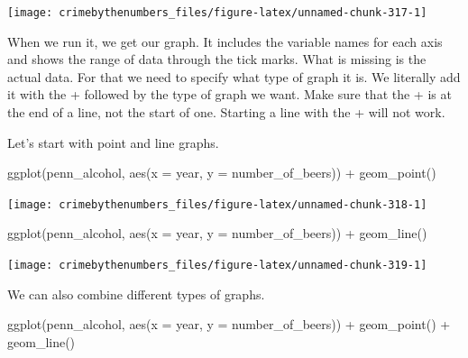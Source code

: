 \documentclass[
]{krantz}
\makeatletter
\newenvironment{Shaded}{\begin{snugshade}}{\end{snugshade}}
\newcommand{\AttributeTok}[1]{\textcolor[rgb]{0.61,0.61,0.61}{#1}}
\newcommand{\FunctionTok}[1]{\textcolor[rgb]{0,0,0}{#1}}
\newcommand{\NormalTok}[1]{#1}
\newcommand{\SpecialCharTok}[1]{\textcolor[rgb]{0,0,0}{#1}}
\newenvironment{kframe}{%
\medskip{}
\setlength{\fboxsep}{.8em}
 \def\at@end@of@kframe{}%
 \ifinner\ifhmode%
  \def\at@end@of@kframe{\end{minipage}}%
  \begin{minipage}{\columnwidth}%
 \fi\fi%
 \def\FrameCommand##1{\hskip\@totalleftmargin \hskip-\fboxsep
 \colorbox{shadecolor}{##1}\hskip-\fboxsep
     \hskip-\linewidth \hskip-\@totalleftmargin \hskip\columnwidth}%
 \MakeFramed {\advance\hsize-\width
   \@totalleftmargin\z@ \linewidth\hsize
   \@setminipage}}%
 {\par\unskip\endMakeFramed%
 \at@end@of@kframe}
\renewenvironment{Shaded}{\begin{kframe}}{\end{kframe}}
\makeatother
\begin{document}
\begin{center}\texttt{[image: crimebythenumbers\_files/figure-latex/unnamed-chunk-317-1]} \end{center}

When we run it, we get our graph. It includes the variable names for each axis and shows the range of data through the tick marks. What is missing is the actual data. For that we need to specify what type of graph it is. We literally add it with the + followed by the type of graph we want. Make sure that the + is at the end of a line, not the start of one. Starting a line with the + will not work.

Let's start with point and line graphs.

\begin{Shaded}
\begin{Highlighting}[]
\FunctionTok{ggplot}\NormalTok{(penn\_alcohol, }\FunctionTok{aes}\NormalTok{(}\AttributeTok{x =}\NormalTok{ year, }\AttributeTok{y =}\NormalTok{ number\_of\_beers)) }\SpecialCharTok{+}
  \FunctionTok{geom\_point}\NormalTok{()}
\end{Highlighting}
\end{Shaded}

\begin{center}\texttt{[image: crimebythenumbers\_files/figure-latex/unnamed-chunk-318-1]} \end{center}

\begin{Shaded}
\begin{Highlighting}[]
\FunctionTok{ggplot}\NormalTok{(penn\_alcohol, }\FunctionTok{aes}\NormalTok{(}\AttributeTok{x =}\NormalTok{ year, }\AttributeTok{y =}\NormalTok{ number\_of\_beers)) }\SpecialCharTok{+}
  \FunctionTok{geom\_line}\NormalTok{()}
\end{Highlighting}
\end{Shaded}

\begin{center}\texttt{[image: crimebythenumbers\_files/figure-latex/unnamed-chunk-319-1]} \end{center}

We can also combine different types of graphs.

\begin{Shaded}
\begin{Highlighting}[]
\FunctionTok{ggplot}\NormalTok{(penn\_alcohol, }\FunctionTok{aes}\NormalTok{(}\AttributeTok{x =}\NormalTok{ year, }\AttributeTok{y =}\NormalTok{ number\_of\_beers)) }\SpecialCharTok{+}
  \FunctionTok{geom\_point}\NormalTok{() }\SpecialCharTok{+}
  \FunctionTok{geom\_line}\NormalTok{()}
\end{Highlighting}
\end{Shaded}
\end{document}
